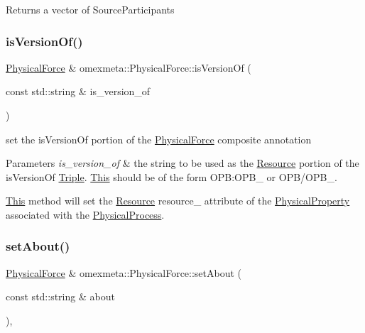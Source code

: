 \begin{DoxyReturn}{Returns}
a vector of Source\+Participants 
\end{DoxyReturn}
\mbox{\label{classomexmeta_1_1PhysicalForce_ab05616b46d417cc7376ae58abd4fe0e6}} 
\subsubsection{\texorpdfstring{is\+Version\+Of()}{isVersionOf()}}
{\footnotesize\ttfamily \hyperlink{classomexmeta_1_1PhysicalForce}{Physical\+Force} \& omexmeta\+::\+Physical\+Force\+::is\+Version\+Of (\begin{DoxyParamCaption}\item[{const std\+::string \&}]{is\+\_\+version\+\_\+of }\end{DoxyParamCaption})}



set the is\+Version\+Of portion of the \hyperlink{classomexmeta_1_1PhysicalForce}{Physical\+Force} composite annotation 


\begin{DoxyParams}{Parameters}
{\em is\+\_\+version\+\_\+of} & the string to be used as the \hyperlink{classomexmeta_1_1Resource}{Resource} portion of the is\+Version\+Of \hyperlink{classomexmeta_1_1Triple}{Triple}. \hyperlink{classThis}{This} should be of the form O\+PB\+:O\+P\+B\+\_ or O\+P\+B/\+O\+P\+B\+\_.\\
\hline
\end{DoxyParams}
\hyperlink{classThis}{This} method will set the \hyperlink{classomexmeta_1_1Resource}{Resource} resource\+\_\+ attribute of the \hyperlink{classomexmeta_1_1PhysicalProperty}{Physical\+Property} associated with the \hyperlink{classomexmeta_1_1PhysicalProcess}{Physical\+Process}. \mbox{\label{classomexmeta_1_1PhysicalForce_a77345d665e492085b81d96337711dc35}} 
\subsubsection{\texorpdfstring{set\+About()}{setAbout()}}
{\footnotesize\ttfamily \hyperlink{classomexmeta_1_1PhysicalForce}{Physical\+Force} \& omexmeta\+::\+Physical\+Force\+::set\+About (\begin{DoxyParamCaption}\item[{const std\+::string \&}]{about }\end{DoxyParamCaption})\hspace{0.3cm}{\ttfamily [override]}, {\ttfamily [virtual]}}



